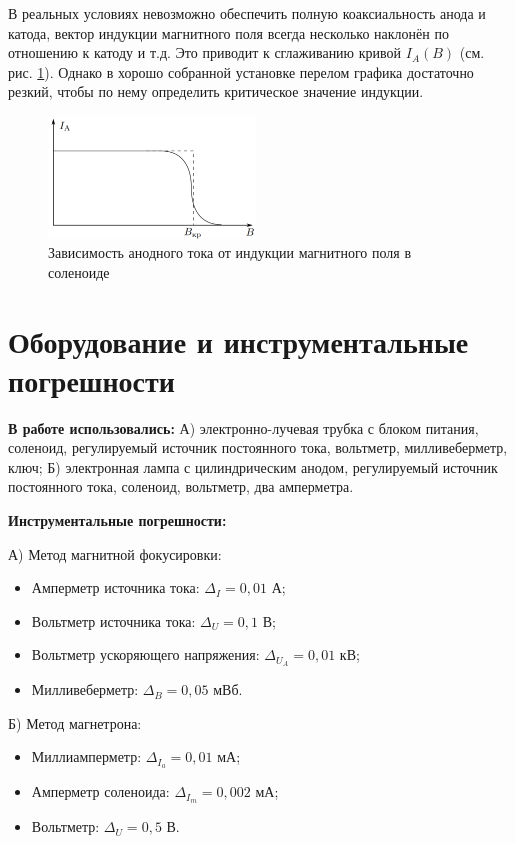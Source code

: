 \documentclass[a4paper,12pt]{article} %
\begin{document}
В реальных условиях невозможно обеспечить полную коаксиальность анода и катода, вектор индукции магнитного поля всегда несколько наклонён по отношению к катоду и т.д. Это приводит к сглаживанию кривой $I_A(B)$ (см. рис. \ref{fig:IA}). Однако в хорошо собранной установке перелом графика достаточно резкий, чтобы по нему определить критическое значение индукции.

\begin{figure}
    \centering
    \includegraphics[width = 0.49\textwidth]{IA.png}
    \caption{Зависимость анодного тока от индукции магнитного поля в соленоиде}
    \label{fig:IA}
\end{figure}

\section{Оборудование и инструментальные погрешности}

\textbf{В работе использовались:} А) электронно-лучевая трубка с блоком питания, соленоид, регулируемый источник постоянного тока, вольтметр, милливеберметр, ключ; Б) электронная лампа с цилиндрическим анодом, регулируемый источник постоянного тока, соленоид, вольтметр, два амперметра.

\textbf{Инструментальные погрешности:}

А) Метод магнитной фокусировки:
\begin{itemize}
    \item Амперметр источника тока: $\Delta_I = 0,01$ А;
    \item Вольтметр источника тока: $\Delta_U = 0,1$ В;
    \item Вольтметр ускоряющего напряжения: $\Delta_{U_A} = 0,01$ кВ;
    \item Милливеберметр: $\Delta_B = 0,05$ мВб.
\end{itemize}

Б) Метод магнетрона:
\begin{itemize}
    \item Миллиамперметр: $\Delta_{I_a} = 0,01$ мА;
    \item Амперметр соленоида: $\Delta_{I_m} = 0,002$ мА;
    \item Вольтметр: $\Delta_U = 0,5$ В.
\end{itemize}
\end{document}
